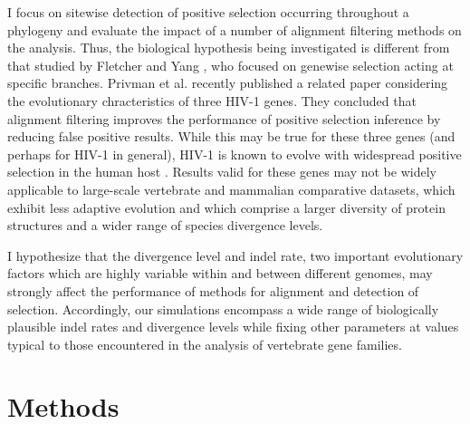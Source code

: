 I focus on sitewise detection of positive selection occurring
throughout a phylogeny and evaluate the impact of a number of
alignment filtering methods on the \sw analysis. Thus, the biological
hypothesis being investigated is different from that studied by
Fletcher and Yang \citeyearpar{Fletcher2010Effect}, who focused on
genewise selection acting at specific branches.  Privman et
al. \citeyearpar{Privman2011Improving} recently published a related
paper considering the evolutionary chracteristics of three HIV-1
genes. They concluded that alignment filtering improves the
performance of positive selection inference by reducing false positive
results. While this may be true for these three genes (and perhaps for
HIV-1 in general), HIV-1 is known to evolve with widespread positive
selection in the human host \citep{Yang2003Widespread}. Results valid
for these genes may not be widely applicable to large-scale vertebrate
and mammalian comparative datasets, which exhibit less adaptive
evolution \citep{Kosiol2008Patterns} and which comprise a larger
diversity of protein structures and a wider range of species
divergence levels.

I hypothesize that the divergence level and indel rate, two important
evolutionary factors which are highly variable within and between
different genomes, may strongly affect the performance of methods for
alignment and detection of selection. Accordingly, our simulations
encompass a wide range of biologically plausible indel rates and
divergence levels while fixing other parameters at values typical to
those encountered in the \sw analysis of vertebrate gene families.

\section{Methods}


